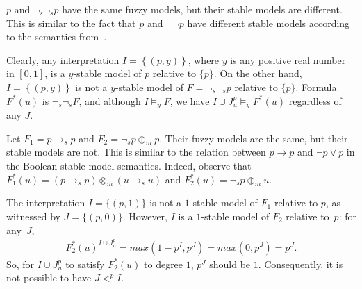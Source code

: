 \documentclass[runningheads]{llncs}
\def\ba{\begin{array}}
\def\ea{\end{array}}
\def\rar{\rightarrow}
\def\fand{\otimes}
\def\for{\oplus}
\begin{document}
\begin{example}
$p$ and $\neg_{\!s}\neg_{\!s} p$ have the same fuzzy models, but their
stable models are different. This is similar to the fact that $p$ and
$\neg\neg p$ have different stable models according to the semantics
from~\cite{ferraris11stable}.

Clearly, any interpretation $I = \left\{(p, y)\right\}$, where $y$ is any positive real number in $\left[0, 1\right]$, is a $y$-stable model of $p$
relative to $\{p\}$. On the other hand, $I = \left\{(p, y)\right\}$ is not a $y$-stable model of $F = \neg_{\!s}\neg_{\!s} p$ relative to $\{p\}$.  
Formula $F^*(u)$ is $\neg_{\!s}\neg_{\!s} F$, and although $I\models_y F$,
we have $I\cup J^p_u\models_y F^*(u)$ regardless of any  $J$. %
% 
\end{example}


\begin{example}
Let $F_1 = p \rar_s p$ and $F_2 = \neg_{\!s} p \for_m p$. Their fuzzy
models are the same, but their stable models are not.
This is similar to the relation between $p\rar p$ and
$\neg p\lor p$ in the Boolean stable model semantics. 
%
Indeed, observe that \hbox{$F_1^*(u) = (p \rar_s p) \fand_m (u \rar_s u)$} 
and $F_2^*(u) = \neg_{\!s} p \for_m u$. 

The interpretation $I=\{(p, 1)\}$ is not a $1$-stable model
of $F_1$ relative to $p$, as witnessed by $J =\{(p,0)\}$. 
However, $I$ is a $1$-stable model of $F_2$ relative to~$p$: for
any~$J$,
\[
\ba {rl}
   F_2^*(u)^{I\cup J^{p}_{u}} = max\left(1-p^I, p^J\right) 
    = max\left(0, p^J\right) 
    = p^J.
\ea
\]
So, for $I\cup J^{p}_{u}$ to satisfy $F_2^*(u)$ to degree $1$, 
$p^J$ should be $1$.
Consequently, it is not possible to have $J <^{p} I$. 
\end{example}
\end{document}
